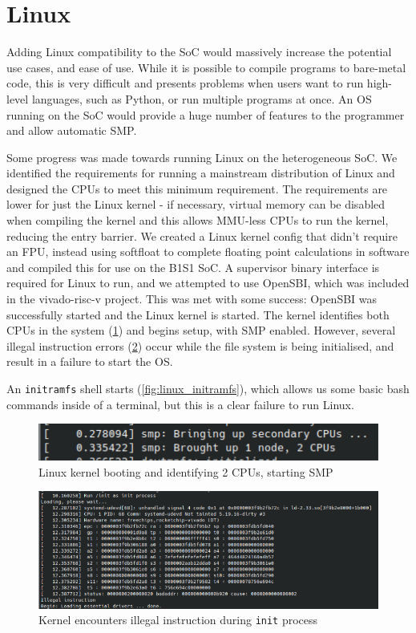 \section{Linux}
\label{sec:linux}
Adding Linux compatibility to the SoC would massively increase the potential use cases, and ease of use. While it is possible to compile programs to bare-metal code, this is very difficult and presents problems when users want to run high-level languages, such as Python, or run multiple programs at once. An OS running on the SoC would provide a huge number of features to the programmer and allow automatic SMP.

Some progress was made towards running Linux on the heterogeneous SoC. We identified the requirements for running a mainstream distribution of Linux and designed the CPUs to meet this minimum requirement. The requirements are lower for just the Linux kernel - if necessary, virtual memory can be disabled when compiling the kernel and this allows MMU-less CPUs to run the kernel, reducing the entry barrier. We created a Linux kernel config that didn't require an FPU, instead using softfloat to complete floating point calculations in software and compiled this for use on the B1S1 SoC. A supervisor binary interface is required for Linux to run, and we attempted to use OpenSBI, which was included in the vivado-risc-v\cite{vivado-risc-v} project. This was met with some success: OpenSBI was successfully started and the Linux kernel is started. The kernel identifies both CPUs in the system (\ref{fig:linux_smp}) and begins setup, with SMP enabled. However, several illegal instruction errors (\ref{fig:linux_illegal_inst}) occur while the file system is being initialised, and result in a failure to start the OS. 

An \texttt{initramfs} shell starts (\ref{fig:linux_initramfs}), which allows us some basic bash commands inside of a terminal, but this is a clear failure to run Linux.

\begin{figure}[h!]
    \centering
    \includegraphics[width=\textwidth]{img/linux_smp.png}
    \caption{Linux kernel booting and identifying 2 CPUs, starting SMP}
    \label{fig:linux_smp}
\end{figure}

\begin{figure}[h!]
    \centering
    \includegraphics[width=\textwidth]{img/illegal_inst.png}
    \caption{Kernel encounters illegal instruction during \texttt{init} process}
    \label{fig:linux_illegal_inst}
\end{figure}

